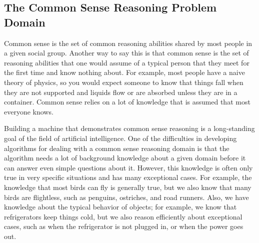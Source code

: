 \subsection{The Common Sense Reasoning Problem Domain}

Common sense is the set of common reasoning abilities shared by most
people in a given social group.  Another way to say this is that
common sense is the set of reasoning abilities that one would assume
of a typical person that they meet for the first time and know nothing
about.  For example, most people have a naive theory of physics, so
you would expect someone to know that things fall when they are not
supported and liquids flow or are absorbed unless they are in a
container.  Common sense relies on a lot of knowledge that is assumed
that most everyone knows.








Building a machine that demonstrates common sense reasoning is a
long-standing goal of the field of artificial intelligence.  One of
the difficulties in developing algorithms for dealing with a common
sense reasoning domain is that the algorithm needs a lot of background
knowledge about a given domain before it can answer even simple
questions about it.  However, this knowledge is often only true in
very specific situations and has many exceptional cases.  For example,
the knowledge that most birds can fly is generally true, but we also
know that many birds are flightless, such as penguins, ostriches, and
road runners.  Also, we have knowledge about the typical behavior of
objects; for example, we know that refrigerators keep things cold,
but we also reason efficiently about exceptional cases, such as when
the refrigerator is not plugged in, or when the power goes out.

